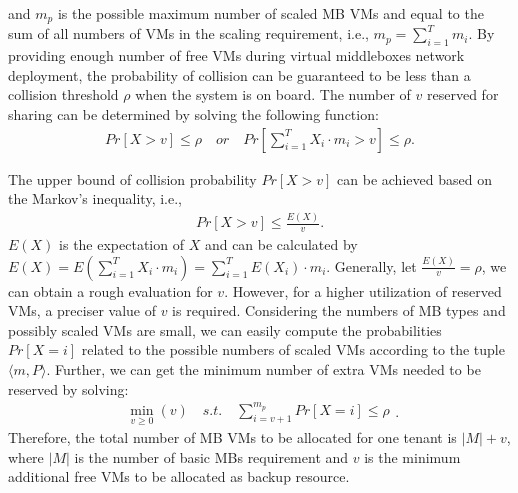 \documentclass[review]{elsarticle}
\begin{document}
and $m_{p}$ is the possible maximum number of scaled MB VMs and equal to the sum of all numbers of VMs in the scaling requirement, i.e., $m_{p}=\sum_{i=1}^{T} m_i$. 
By providing enough number of free VMs during virtual middleboxes network deployment, the probability of collision can be guaranteed to be less than a collision threshold $\rho$ when the system is on board. The number of $v$ reserved for sharing can be determined by solving the following function:
\begin{equation}\label{equ:collision}  
\begin{aligned} 
Pr\left[ X>v \right] \leq \rho \quad or	\quad Pr\left[ \sum_{i=1}^{T} X_{i}\cdot m_{i} > v \right] \leq \rho.
\end{aligned}
\end{equation}

The upper bound of collision probability $Pr\left[X>v\right]$ can be achieved based on the Markov's inequality, i.e.,
\begin{equation}
\begin{aligned} 
Pr\left[X>v\right]\leq \frac{E(X)}{v}.
\end{aligned}
\end{equation} 
$E(X)$ is the expectation of $X$ and can be calculated by $E(X)=E(\sum_{i=1}^{T}X_{i}\cdot m_{i}) = \sum_{i=1}^{T}E(X_i)\cdot m_i$. Generally, let $\frac{E(X)}{v}=\rho$, we can obtain a rough evaluation for $v$.
However, for a higher utilization of reserved VMs, a preciser  value of $v$ is required.
Considering the numbers of MB types and possibly scaled VMs are small, we can easily compute the probabilities $Pr\left[X=i\right]$ related to the possible numbers of scaled VMs according to the tuple $\langle m, P \rangle$.
Further, we can get the minimum number of extra VMs needed to be reserved by solving: 
\begin{equation}
\begin{aligned}
\min\limits_{v\geq 0}(v) \quad s.t. \quad \sum_{i=v+1}^{m_{p}}Pr\left[X=i \right] \leq \rho
\end{aligned} .
\end{equation}
Therefore, the total number of MB VMs to be allocated for one tenant is $|M|+v$, where $|M|$ is the number of basic MBs requirement and $v$ is the minimum additional free VMs to be allocated as backup resource. %
\end{document}
